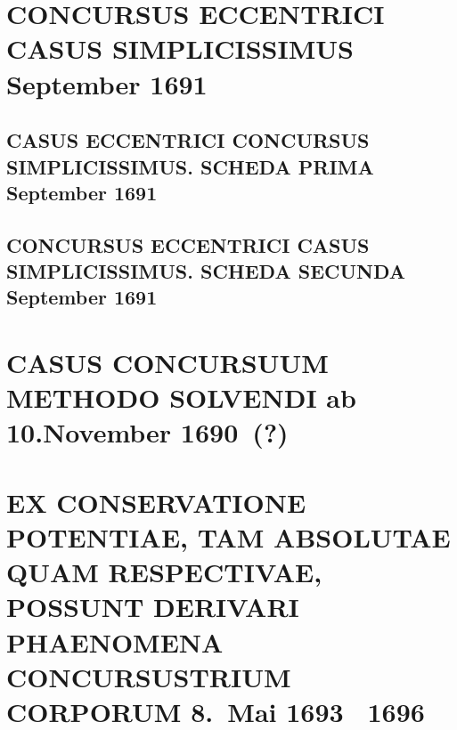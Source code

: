 \documentclass[%
fontsize=10pt,
]{scrbook}
\DeclareRobustCommand{\bracks}[1]{%
\textup{\lbrack}#1\textup{\rbrack}}
\begin{document}
\chapter[tocentry={Concursus eccentrici casus simplicissimus
\enskip September 1691},
head={Concursus eccentrici casus simplicissimus}]%
{\MakeUppercase{Concursus eccentrici casus simplicissimus}
\newline September 1691} %
\label{cecs_intro}


\section[tocentry={Casus eccentrici concursus simplicissimus. Scheda prima
\enskip September 1691},
head={Casus eccentrici concursus simplicissimus. Scheda I%
}]%
{\MakeUppercase{Casus eccentrici concursus simplicissimus. Scheda prima}
\newline September 1691}
\label{60106}


\section[tocentry={Concursus eccentrici casus simplicissimus. Scheda secunda
\enskip September 1691},
head={Concursus eccentrici casus simplicissimus. Scheda II%
}]%
{\MakeUppercase{Concursus eccentrici casus simplicissimus. Scheda secunda}
\newline September 1691}
\label{60107}




\chapter[tocentry={Casus concursuum methodo solvendi
\enskip\bracks{%
ab 10.\;November 1690~(?)%
}},
head={Casus concursuum methodo solvendi}]%
{\MakeUppercase{Casus concursuum methodo solvendi}
\newline\bracks{%
ab 10.\;November 1690~(?)%
}}%
\label{58947}





\chapter[tocentry={Ex conservatione potentiae, tam absolutae quam respectivae, possunt derivari phaenomena concursus trium corporum
\enskip \bracks{8.~Mai 1693 \textendash\ 1696}%
},
head={Phaenomena concursus trium corporum}]%
{\MakeUppercase{Ex conservatione potentiae, tam absolutae quam respectivae, possunt derivari phaenomena concursus\linebreak trium corporum}
\newline \bracks{8.~Mai 1693 \textendash\ 1696}%
}
\label{intro_tam-abs-quam-resp}

\end{document}
